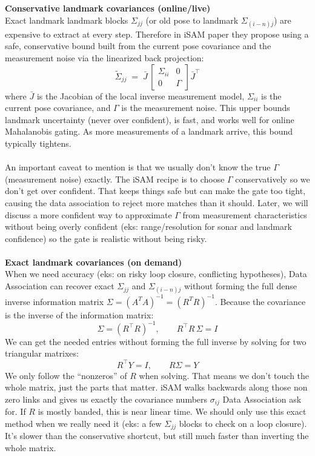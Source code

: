 \noindent
\textbf{Conservative landmark covariances (online/live)} 
\\ \noindent
Exact landmark landmark blocks $\Sigma_{jj}$ (or old pose to landmark $\Sigma_{(i-n)j}$) are expensive to extract at every step. Therefore in iSAM paper \cite{iSAM_paper} they propose using a safe, conservative bound built from the current pose covariance and the measurement noise via the linearized back projection:
$$
    \tilde\Sigma_{jj}
    \;=\;
    \bar J\,
    \begin{bmatrix}
    \Sigma_{ii} & 0\\[2pt]
    0 & \Gamma
    \end{bmatrix}
    \bar J^\top
$$
where $\bar J$ is the Jacobian of the local inverse measurement model, $\Sigma_{ii}$ is the current pose covariance, and $\Gamma$ is the measurement noise. This upper bounds landmark uncertainty (never over confident), is fast, and works well for online Mahalanobis gating. As more measurements of a landmark arrive, this bound typically tightens.
\\ \\
An important caveat to mention is that we usually don't know the true $\Gamma$ (measurement noise) exactly. The iSAM recipe is to choose $\Gamma$ conservatively so we don't get over confident. That keeps things safe but can make the gate too tight, causing the data association to reject more matches than it should. Later, we will discuss a more confident way to approximate $\Gamma$ from measurement characteristics without being overly confident (eks: range/resolution for sonar and landmark confidence) so the gate is realistic without being risky.
\\ \\
\textbf{Exact landmark covariances (on demand)} 
\\ \noindent
When we need accuracy (eks: on risky loop closure, conflicting hypotheses), Data Association can recover exact $\Sigma_{jj}$ and $\Sigma_{(i-n)j}$ without forming the full dense inverse information matrix $\Sigma=(A^{T}A)^{-1}=(R^{T}R)^{-1}$. Because the covariance is the inverse of the information matrix:
$$
    \Sigma=(R^\top R)^{-1}, \qquad R^\top R\,\Sigma = I
$$
We can get the needed entries without forming the full inverse by solving for two triangular matrixes:
$$
R^\top Y = I, \qquad R \Sigma = Y
$$
We only follow the ``nonzeros'' of $R$ when solving. That means we don't touch the whole matrix, just the parts that matter. iSAM walks backwards along those non zero links and gives us exactly the covariance numbers $\sigma_{ij}$ Data Association ask for. If $R$ is mostly banded, this is near linear time. We should only use this exact method when we really need it (eks: a few $\Sigma_{jj}$ blocks to check on a loop closure). It's slower than the conservative shortcut, but still much faster than inverting the whole matrix.
